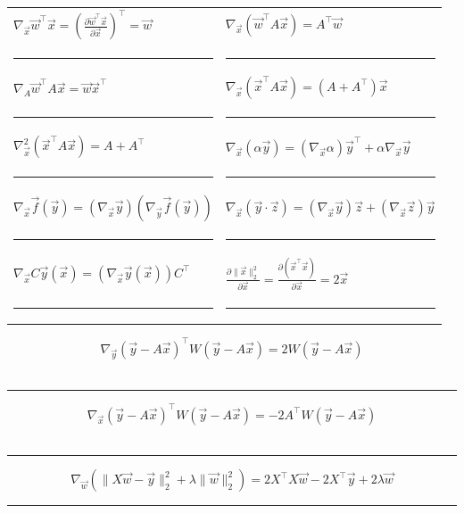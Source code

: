 \documentclass[10pt,landscape]{article}
\newcommand{\pderiv}[2]{\frac{\partial #1}{\partial #2}}
\newcommand{\wrap}[3]{\left#1#3\right#2}
\begin{document}
\begin{multicols}{3}
\begin{tabular}{@{}p{}%
                @{}p{}@{}}
$\nabla_{\vec x}{\vec w^\top \vec x} = \wrap(){\pderiv{\vec w^\top \vec x}{\vec x}}^\top = \vec{w}$ & $\nabla_{\vec x}{(\vec w^\top A\vec x)}= A^{\top}\vec w$ \\
\hrule&\hrule\\
$\nabla_{A}{\vec w^\top A\vec x}=\vec w\vec x^\top$ & $\nabla_{\vec x}{(\vec x^\top A\vec x)} = (A+A^\top)\vec x$ \\
\hrule&\hrule\\
$\nabla_{\vec x}^2{(\vec x^\top A\vec x)} = A+A^\top$ & $\nabla_{\vec x}{(\alpha \vec{y})} = (\nabla_{\vec x}{\alpha})\vec{y}^{\top} + \alpha \nabla_{\vec x}{\vec y}$ \\
\hrule&\hrule
\\
$\nabla_{\vec x}{\vec{f}(\vec y)} = (\nabla_{\vec x}{\vec y})(\nabla_{\vec y}{\vec{f}(\vec y)})$ & $\nabla_{\vec x}(\vec{y} \cdot \vec{z}) = (\nabla_{\vec x}{\vec y})\vec{z}+(\nabla_{\vec x}{\vec z})\vec{y}$ \\
\hrule & \hrule
\\
$\nabla_{\vec x}{C\vec y(\vec{x})} = (\nabla_{\vec x}{\vec y(\vec x)})C^\top$ & $\pderiv{\|\vec x\|_2^2}{\vec x}=\pderiv{(\vec x^\top\vec x)}{\vec x}=2\vec x$ \\
\hrule&\hrule
\end{tabular} \vspace{-0.1cm}
$$\nabla_{\vec{y}} (\vec{y} - A \vec{x})^{\top} W(\vec{y} - A \vec{x}) = 2W(\vec{y} - A \vec{x})$$ \\
\hrule
$$\nabla_{\vec{x}} (\vec{y} - A \vec{x})^{\top} W(\vec{y} - A \vec{x}) = -2A^{\top}W(\vec{y} - A \vec{x})$$  \\
\hrule
$$\nabla_{\vec w} \wrap(){\|X\vec w-\vec y\|_2^2+\lambda\|\vec w\|_2^2} = 2X^\top X\vec w-2X^\top \vec y+2\lambda\vec w$$
\hrule


\end{multicols}
\end{document}
